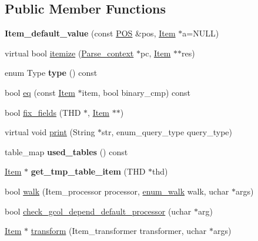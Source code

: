 \subsection*{Public Member Functions}
\begin{DoxyCompactItemize}
\item 
\mbox{\label{classItem__default__value_ab1520a1a42f66db5426e6969132b9c25}} 
{\bfseries Item\+\_\+default\+\_\+value} (const \mbox{\hyperlink{structYYLTYPE}{P\+OS}} \&pos, \mbox{\hyperlink{classItem}{Item}} $\ast$a=N\+U\+LL)
\item 
virtual bool \mbox{\hyperlink{classItem__default__value_afb6673a2601e5f5b3f1a80243ce73c67}{itemize}} (\mbox{\hyperlink{structParse__context}{Parse\+\_\+context}} $\ast$pc, \mbox{\hyperlink{classItem}{Item}} $\ast$$\ast$res)
\item 
\mbox{\label{classItem__default__value_aa4690341de0a1114aaec2defef5354f6}} 
enum Type {\bfseries type} () const
\item 
bool \mbox{\hyperlink{classItem__default__value_a2be2ba1ab394829380e6f0525f9f5d07}{eq}} (const \mbox{\hyperlink{classItem}{Item}} $\ast$item, bool binary\+\_\+cmp) const
\item 
bool \mbox{\hyperlink{classItem__default__value_a49d46d9f91ce74c6b5a33c199ccdc774}{fix\+\_\+fields}} (T\+HD $\ast$, \mbox{\hyperlink{classItem}{Item}} $\ast$$\ast$)
\item 
virtual void \mbox{\hyperlink{classItem__default__value_adc863c4577d7c10a0cbf1c006c8087a6}{print}} (String $\ast$str, enum\+\_\+query\+\_\+type query\+\_\+type)
\item 
\mbox{\label{classItem__default__value_a9e12ff6bd622df1889375361d4cc6ac0}} 
table\+\_\+map {\bfseries used\+\_\+tables} () const
\item 
\mbox{\label{classItem__default__value_a7558f1caae26ba29e004e20eb320891a}} 
\mbox{\hyperlink{classItem}{Item}} $\ast$ {\bfseries get\+\_\+tmp\+\_\+table\+\_\+item} (T\+HD $\ast$thd)
\item 
bool \mbox{\hyperlink{classItem__default__value_aa26d7118262053541ab095b9f9c7d53f}{walk}} (Item\+\_\+processor processor, \mbox{\hyperlink{classItem_a4e68f315ba2a26543339e9f0efed3695}{enum\+\_\+walk}} walk, uchar $\ast$args)
\item 
bool \mbox{\hyperlink{classItem__default__value_a309bddf86a7472371f02ab9ed80e6b27}{check\+\_\+gcol\+\_\+depend\+\_\+default\+\_\+processor}} (uchar $\ast$arg)
\item 
\mbox{\hyperlink{classItem}{Item}} $\ast$ \mbox{\hyperlink{classItem__default__value_af8efb13ec5ade9320533c1e508d995ee}{transform}} (Item\+\_\+transformer transformer, uchar $\ast$args)
\end{DoxyCompactItemize}
